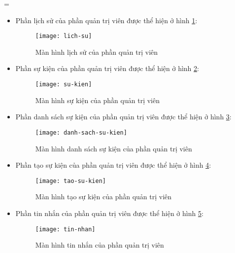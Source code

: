 =\documentclass[../Thesis.tex]{subfiles}
\begin{document}
\begin{itemize}
                \item Phần lịch sử của phần quản trị viên được thể hiện ở hình \ref{fig:lich-su}:
                \begin{figure}[hbt!]
                    \centering\texttt{[image: lich-su]}
                    \caption{Màn hình lịch sử của phần quản trị viên}
                    \label{fig:lich-su}
                \end{figure}
                \FloatBarrier

                \item Phần sự kiện của phần quản trị viên được thể hiện ở hình \ref{fig:su-kien}:
                \begin{figure}[hbt!]
                    \centering\texttt{[image: su-kien]}
                    \caption{Màn hình sự kiện của phần quản trị viên}
                    \label{fig:su-kien}
                \end{figure}
                \FloatBarrier

                \item Phần danh sách sự kiện của phần quản trị viên được thể hiện ở hình \ref{fig:danh-sach-su-kien}:
                \begin{figure}[hbt!]
                    \centering\texttt{[image: danh-sach-su-kien]}
                    \caption{Màn hình danh sách sự kiện của phần quản trị viên}
                    \label{fig:danh-sach-su-kien}
                \end{figure}
                \FloatBarrier

                \item Phần tạo sự kiện của phần quản trị viên được thể hiện ở hình \ref{fig:tao-su-kien}:
                \begin{figure}[hbt!]
                    \centering\texttt{[image: tao-su-kien]}
                    \caption{Màn hình tạo sự kiện của phần quản trị viên}
                    \label{fig:tao-su-kien}
                \end{figure}
                \FloatBarrier

                \item Phần tin nhắn của phần quản trị viên được thể hiện ở hình \ref{fig:tin-nhan}:
                \begin{figure}[hbt!]
                    \centering\texttt{[image: tin-nhan]}
                    \caption{Màn hình tin nhắn của phần quản trị viên}
                    \label{fig:tin-nhan}
                \end{figure}
                \FloatBarrier


\end{itemize}
\end{document}
